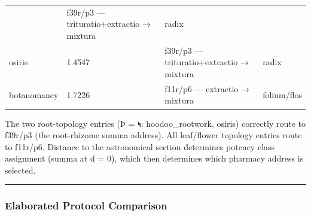 \begin{longtable}[]{@{}llll@{}}
\begin{minipage}[t]{0.22\columnwidth}
\end{minipage} & \begin{minipage}[t]{0.22\columnwidth}\raggedright
f39r/p3 --- trituratio+extractio → mixtura\strut
\end{minipage} & \begin{minipage}[t]{0.22\columnwidth}\raggedright
radix\strut
\end{minipage}\tabularnewline
\begin{minipage}[t]{0.22\columnwidth}\raggedright
osiris\strut
\end{minipage} & \begin{minipage}[t]{0.22\columnwidth}\raggedright
1.4547\strut
\end{minipage} & \begin{minipage}[t]{0.22\columnwidth}\raggedright
f39r/p3 --- trituratio+extractio → mixtura\strut
\end{minipage} & \begin{minipage}[t]{0.22\columnwidth}\raggedright
radix\strut
\end{minipage}\tabularnewline
\begin{minipage}[t]{0.22\columnwidth}\raggedright
botanomancy\strut
\end{minipage} & \begin{minipage}[t]{0.22\columnwidth}\raggedright
1.7226\strut
\end{minipage} & \begin{minipage}[t]{0.22\columnwidth}\raggedright
f11r/p6 --- extractio → mixtura\strut
\end{minipage} & \begin{minipage}[t]{0.22\columnwidth}\raggedright
folium/flos\strut
\end{minipage}\tabularnewline
\bottomrule
\end{longtable}

The two root-topology entries (Þ = 𐑰: hoodoo\_rootwork, osiris)
correctly route to f39r/p3 (the root-rhizome summa address). All
leaf/flower topology entries route to f11r/p6. Distance to the
astronomical section determines potency class assignment (summa at d =
0), which then determines which pharmacy address is selected.

\begin{center}\rule{0.5\linewidth}{0.5pt}\end{center}

\hypertarget{elaborated-protocol-comparison}{%
\subsubsection{Elaborated Protocol
Comparison}\label{elaborated-protocol-comparison}}

